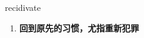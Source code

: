 
\begin{frame}
{\huge recidivate}
\begin{center}
\begin{enumerate}\Large
  \item \textbf{回到原先的习惯，尤指重新犯罪}
\end{enumerate}
\end{center}
\end{frame}
